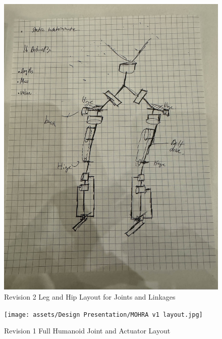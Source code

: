\documentclass{article}
\begin{document}
\begin{figure}[H]
    \centering
    \includegraphics[scale=0.1]{assets/Design Presentation/Hip Rev 3.jpg}
    \caption{Revision 2 Leg and Hip Layout for Joints and Linkages}
    \label{fig:enter-label}
\end{figure}

\begin{figure}[H]
    \centering
    \texttt{[image: assets/Design Presentation/MOHRA v1 layout.jpg]}
    \caption{Revision 1 Full Humanoid Joint and Actuator Layout}
    \label{fig:enter-label}
\end{figure}
\end{document}
